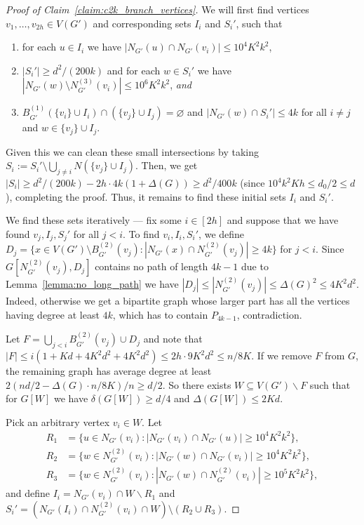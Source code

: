 \documentclass[10pt, a4paper]{article}
\numberwithin{theorem}{section} %
\theoremstyle{remark}
\theoremstyle{definition}
\begin{document}
    \begin{proof}[Proof of Claim~\ref{claim:c2k_branch_vertices}]
        We will first find vertices $v_1, \dots, v_{2h} \in V(G')$ and corresponding sets $I_i$ and $S_i'$, such that
        \begin{enumerate}
            \item for each $u \in I_i$ we have $|N_{G'}(u) \cap N_{G'}(v_i)| \leq 10^4K^2k^2$,
            \item $|S_i'| \geq d^2/(200k)$ and for each $w \in S_i'$ we have $|N_{G'}(w) \setminus N_{G'}^{(3)}(v_i)| \leq 10^6 K^2k^2$, \emph{and}
            \item $B^{(1)}_{G'}(\{v_i\} \cup I_i) \cap (\{v_j\} \cup I_j) = \varnothing$ and $|N_{G'}(w) \cap S_i'| \leq 4k$ for all $i\neq j$ and $w \in \{v_j\} \cup I_j$.
        \end{enumerate}
        Given this we can clean these small intersections by taking $S_i:= S_i'\setminus \bigcup_{j\neq i}N(\{v_j\}\cup I_j)$.
        Then, we get $|S_i|\ge d^2/(200k)- 2h\cdot 4k(1+\Delta(G))\ge d^2/400k$ (since $10^4 k^2Kh\le d_0/2\leq d$), completing the proof. Thus, it remains to find these initial sets $I_i$ and $S_i'$. 

        We find these sets iteratively --- fix some $i \in [2h]$ and suppose that we have found $v_j, I_j, S_j'$ for all $j < i$.
        To find $v_i, I_i, S_i'$, we define $D_j = \{x \in V(G') \setminus B_{G'}^{(2)}(v_j): |N_{G'}(x) \cap N^{(2)}_{G'}(v_j)| \geq 4k\}$ for $j < i$.
        Since $G[N^{(2)}_{G'}(v_j), D_j]$ contains no path of length $4k-1$ due to Lemma~\ref{lemma:no_long_path} we have $|D_j| \leq |N_{G'}^{(2)}(v_j)| \leq \Delta(G)^2\leq 4K^2d^2$. Indeed, otherwise we get a bipartite graph whose larger part has all the vertices having degree at least $4k$, which has to contain $P_{4k-1}$, contradiction.
        

        Let $F = \bigcup_{j < i} B_{G'}^{(2)}(v_j) \cup D_j$ and note that $|F|\le i (1+Kd +4K^2d^2+4K^2d^2)\le 2h\cdot 9K^2d^2\le n/8K$.
        If we remove $F$ from $G$, the remaining graph has average degree at least $2{(nd/2-\Delta(G)\cdot n/8K)}/{n}\geq d/2$. 
        So there exists $W \subseteq V(G')\backslash F$ such that for $G[W]$ we have $\delta(G[W]) \geq d/4$ and $\Delta(G[W]) \leq 2Kd$.

        Pick an arbitrary vertex $v_i \in W$.
        Let 
        \begin{align*}
            R_1 &= \{u \in N_{G'}(v_i): |N_{G'}(v_i) \cap N_{G'}(u)| \geq 10^4K^2k^2\},\\
            R_2 &= \{w \in N_{G'}^{(2)}(v_i): |N_{G'}(w) \cap N_{G'}(v_i)| \geq 10^4K^2k^2\},\\
            R_3 &= \{ w\in N_{G'}^{(2)}(v_i): |N_{G'}(w) \cap N_{G'}^{(2)}(v_i)| \geq 10^5K^2k^2\},
        \end{align*}
         and define $I_i= N_{G'}(v_i)\cap W\backslash R_1$ and $S_i' = (N_{G'}(I_i) \cap N_{G'}^{(2)}(v_i)\cap W) \setminus (R_2 \cup R_3)$. 
         

\end{proof}
\end{document}
